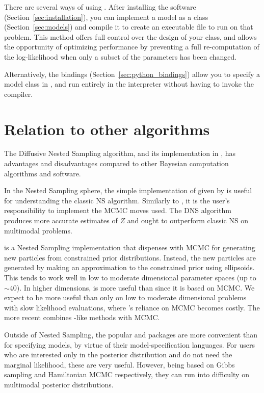 \documentclass[article, nojss]{jss}
\begin{document}
There are several ways of using . After installing the software
(Section~\ref{sec:installation}), you can implement a model as
a  class
(Section~\ref{sec:models}) and compile it to create an executable file
to run  on that problem. This method offers full control over the
design of your class, and allows the opportunity of optimizing
performance by preventing a full re-computation of the log-likelihood when
only a subset of the parameters has been changed.

Alternatively, the 
bindings (Section~\ref{sec:python_bindings}) allow you
to specify a model class in , and run  entirely
in the  interpreter without having to invoke the 
compiler.

\section{Relation to other algorithms}\label{sec:relation}
The Diffusive Nested Sampling algorithm, and its implementation in
, has advantages and disadvantages compared to other Bayesian
computation algorithms and software.

In the Nested Sampling sphere,
the simple  implementation of given by
\citet{skilling2006nested} is useful for understanding the classic NS
algorithm. Similarly to , it is the user's responsibility
to implement the MCMC moves used. The DNS algorithm produces more
accurate estimates of $Z$ and ought to outperform classic NS on multimodal
problems.

 \citep{feroz2009multinest} is a
Nested Sampling implementation
that dispenses with MCMC for generating new particles from constrained
prior distributions. Instead, the new particles are generated by making
an approximation to the constrained prior using ellipsoids. This tends to work
well in low to moderate dimensional parameter spaces (up to $\sim 40$).
In higher dimensions,  is more useful than 
since it is based on MCMC. We expect  to be more useful
than
 only on low to moderate dimensional problems with slow
likelihood evaluations, where 's reliance on MCMC becomes costly.
The more recent  \citep{handley2015polychord} combines
-like methods with MCMC.

Outside of Nested Sampling,
the popular  \citep{jags} and  \citep{stan} packages
are more convenient than  for specifying models, by virtue
of their model-specification languages. For users who are interested only
in the posterior distribution and do not need the marginal likelihood,
these are very useful.
However, being based on Gibbs
sampling and Hamiltonian MCMC respectively, they can run into difficulty
on multimodal posterior distributions.
\end{document}
